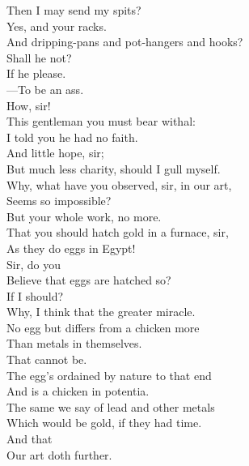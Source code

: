 \documentclass[a4paper,oneside,12pt]{memoir}
\begin{document}
\begin{drama*}
\mammonspeaks Then I may send my spits?\\
\subtlespeaks {} Yes, and your racks.\\
\surlyspeaks And dripping-pans and pot-hangers and hooks?\\
Shall he not?\\
\subtlespeaks {} If he please.\\
\surlyspeaks {} ---To be an ass.\\
\subtlespeaks How, sir!\\
\mammonspeaks {} This gentleman you must bear withal:\\
I told you he had no faith.\\
\surlyspeaks {} And little hope, sir;\\
But much less charity, should I gull myself.\\
\subtlespeaks Why, what have you observed, sir, in our art,\\
Seems so impossible?\\
\surlyspeaks {} But your whole work, no more.\\
That you should hatch gold in a furnace, sir,\\
As they do eggs in Egypt!\\
\subtlespeaks {} Sir, do you\\
Believe that eggs are hatched so?\\
\surlyspeaks {} If I should?\\
\subtlespeaks Why, I think that the greater miracle.\\
No egg but differs from a chicken more\\
Than metals in themselves.\\
\surlyspeaks {} That cannot be.\\
The egg's ordained by nature to that end\\
And is a chicken in potentia.\\
\subtlespeaks The same we say of lead and other metals\\
Which would be gold, if they had time.\\
\mammonspeaks {} And that\\
Our art doth further.\\

\end{drama*}
\end{document}

